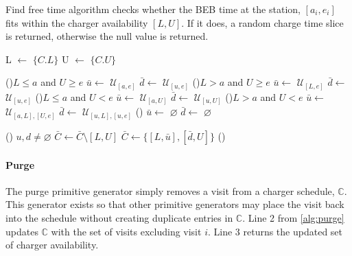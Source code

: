 \documentclass[11pt,a4paper,final]{article}
\newcommand{\C}{\mathbb{C}}                 %
\newcommand{\U}{\mathcal{U}}                %
\begin{document}
\begin{algorithm}[H]
\caption{Find free time algorithm checks whether the BEB time at the station, $[a_i, e_i]$ fits within the charger availability $[L,U]$. If it does, a random charge time slice is returned, otherwise the null value is returned.}
\label{alg:find-free-time}
    \LinesNumbered

     L \(\leftarrow\) \(\{C.L\}\)\; U \(\leftarrow\) \(\{C.U\}\)\;

    \Begin
    {
        \If(\tcc*[f]{If $L < a < e < U]$ (\autoref{subfig:sandwich})}){$L \leq a$ and $U \geq e$}
        {
                $\bar{u}\leftarrow$ $\U_{[a,e]}$\;
                $\bar{d}\leftarrow$ $\U_{[u,e]}$\;
        }
        \ElseIf(){$L > a$ and $U \geq e$}
        {
                $\bar{u}\leftarrow$ $\U_{[L,e]}$\;
                $\bar{d}\leftarrow$ $\U_{[u,e]}$\;
        }
        \ElseIf(){$L \leq a$ and $U < e$}
        {
                $\bar{u}\leftarrow$ $\U_{[a,U]}$\;
                $\bar{d}\leftarrow$ $\U_{[u,U]}$\;
        }
        \ElseIf(){$L > a$ and $U < e$}
        {
                $\bar{u}\leftarrow$ $\U_{[a,L], [U,e]}$\;
                $\bar{d}\leftarrow$ $\U_{[u,L], [u,e]}$\;
        }
        \Else()
        {
                $\bar{u}\leftarrow$ $\varnothing$\;
                $\bar{d}\leftarrow$ $\varnothing$\;
        }

        \If () {$u,d \ne \varnothing$}
        {
            $\bar{C} \leftarrow \bar{C} \setminus [L,U]$
            $\bar{C} \leftarrow \{[L,\bar{u}], [\bar{d}, U]\}$
        }
        \Else()
        {
        }

    }
\end{algorithm}

\paragraph{Purge}
\label{sec:purge}
The purge primitive generator simply removes a visit from a charger schedule, \(\C\). This generator exists so that other
primitive generators may place the visit back into the schedule without creating duplicate entries in \(\C\). Line 2 from
\ref{alg:purge} updates \(\C\) with the set of visits excluding visit \(i\). Line 3 returns the updated set of charger
availability.
\end{document}
